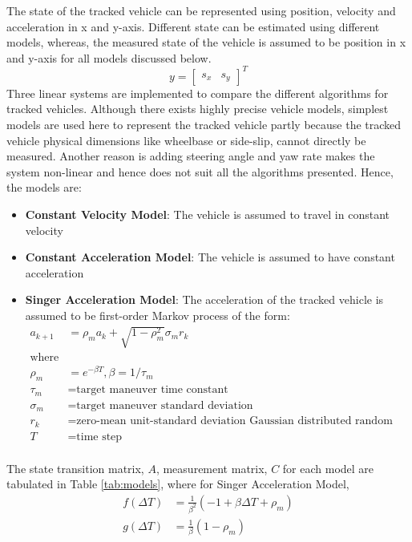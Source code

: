 The state of the tracked vehicle can be represented using position, velocity and acceleration in x and y-axis. Different state can be estimated using different models, whereas, the measured state of the vehicle is assumed to be position in x and y-axis for all models discussed below.
\begin{equation*}
y =[ 
\begin{matrix}
s_x & s_y
\end{matrix}
]^T
\end{equation*}
Three linear systems are implemented to compare the different algorithms for tracked vehicles. Although there exists highly precise vehicle models, simplest models are used here to represent the tracked vehicle partly because the tracked vehicle physical dimensions like wheelbase or side-slip, cannot directly be measured. Another reason is adding steering angle and yaw rate makes the system non-linear and hence does not suit all the algorithms presented. Hence, the models are:
\begin{itemize}
\item \textbf{Constant Velocity Model}: The vehicle is assumed to travel in constant velocity
\item \textbf{Constant Acceleration Model}: The vehicle is assumed to have constant acceleration
\item \textbf{Singer Acceleration Model}: The acceleration of the tracked vehicle is assumed to be first-order Markov process of the form:
\begin{equation}
\begin{split}
a_{k+1} & = \rho_m a_k + \sqrt{1- \rho_m^2} \sigma_m r_k\\
\text{where}\\
\rho_m &= e^{-\beta T}, \beta = 1/\tau_m\\
\tau_m &= \text{target maneuver time constant}\\
\sigma_m &= \text{target maneuver standard deviation}\\
r_k &= \text{zero-mean unit-standard deviation Gaussian distributed random variable}\\
T &= \text{time step}\\
\end{split}
\end{equation}
\end{itemize}
The state transition matrix, $A$, measurement matrix, $C$ for each model are tabulated in Table \ref{tab:models}, where for Singer Acceleration Model,
\begin{equation}
\label{eq:singermodel}
\begin{split}
f(\Delta T) &= \frac{1}{\beta^2}(-1+\beta\Delta T+\rho_m)\\
g(\Delta T) &= \frac{1}{\beta} (1- \rho_m)
\end{split}
\end{equation}
